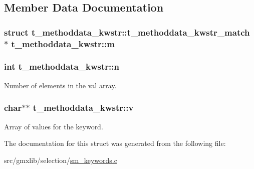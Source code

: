 \subsection{\-Member \-Data \-Documentation}
\hypertarget{structt__methoddata__kwstr_aba33a96f6b5f9459fd368d525bcc6fa9}{
\subsubsection[{m}]{\setlength{\rightskip}{0pt plus 5cm}struct {\bf t\-\_\-methoddata\-\_\-kwstr\-::t\-\_\-methoddata\-\_\-kwstr\-\_\-match}                 $\ast$ {\bf t\-\_\-methoddata\-\_\-kwstr\-::m}}}\label{structt__methoddata__kwstr_aba33a96f6b5f9459fd368d525bcc6fa9}
\hypertarget{structt__methoddata__kwstr_a96ba89545ba0b0dd6b7900989c10c076}{
\subsubsection[{n}]{\setlength{\rightskip}{0pt plus 5cm}int {\bf t\-\_\-methoddata\-\_\-kwstr\-::n}}}\label{structt__methoddata__kwstr_a96ba89545ba0b0dd6b7900989c10c076}
\-Number of elements in the {\ttfamily val} array. \hypertarget{structt__methoddata__kwstr_acbcb7d87d36e038031f135cdc54bff67}{
\subsubsection[{v}]{\setlength{\rightskip}{0pt plus 5cm}char$\ast$$\ast$ {\bf t\-\_\-methoddata\-\_\-kwstr\-::v}}}\label{structt__methoddata__kwstr_acbcb7d87d36e038031f135cdc54bff67}
\-Array of values for the keyword. 

\-The documentation for this struct was generated from the following file\-:\begin{DoxyCompactItemize}
\item 
src/gmxlib/selection/\hyperlink{sm__keywords_8c}{sm\-\_\-keywords.\-c}\end{DoxyCompactItemize}
